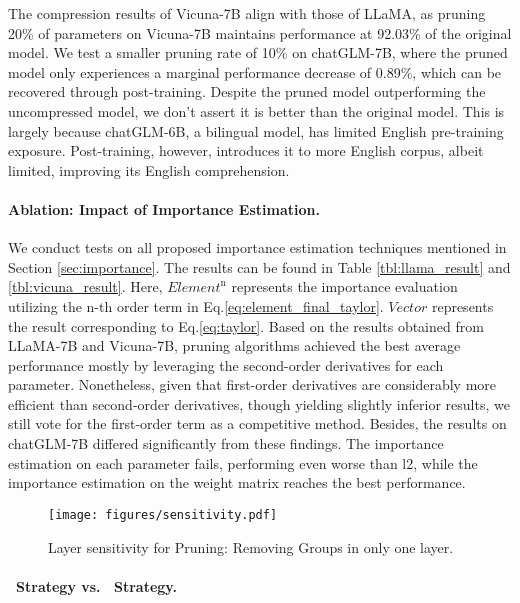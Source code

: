 The compression results of Vicuna-7B align with those of LLaMA, as pruning 20\% of parameters on Vicuna-7B maintains performance at 92.03\% of the original model. We test a smaller pruning rate of 10\% on chatGLM-7B, where the pruned model only experiences a marginal performance decrease of 0.89\%, which can be recovered through post-training. Despite the pruned model outperforming the uncompressed model, we don't assert it is better than the original model. This is largely because chatGLM-6B, a bilingual model, has limited English pre-training exposure. Post-training, however, introduces it to more English corpus, albeit limited, improving its English comprehension.

\paragraph{Ablation: Impact of Importance Estimation.} 
We conduct tests on all proposed importance estimation techniques mentioned in Section \ref{sec:importance}. The results can be found in Table \ref{tbl:llama_result} and \ref{tbl:vicuna_result}. Here, $\textit{Element}^\text{n}$ represents the importance evaluation utilizing the n-th order term in Eq.\ref{eq:element_final_taylor}. $\textit{Vector}$ represents the result corresponding to Eq.\ref{eq:taylor}. Based on the results obtained from LLaMA-7B and Vicuna-7B, pruning algorithms achieved the best average performance mostly by leveraging the second-order derivatives for each parameter. Nonetheless, given that first-order derivatives are considerably more efficient than second-order derivatives, though yielding slightly inferior results, 
we still vote for the first-order term as a competitive method. Besides, the results on chatGLM-7B differed significantly from these findings. The importance estimation on each parameter fails, performing even worse than l2, while the importance estimation on the weight matrix reaches the best performance. 

\begin{wrapfigure}{r}{6.5cm} 
    \vspace{-6mm}
    \texttt{[image: figures/sensitivity.pdf]} 
    \vspace{-2mm}
    \caption{Layer sensitivity for Pruning: Removing Groups in only one layer. 
    } \label{fig:layer_sensitivity}
\vspace{-0.8cm}
\end{wrapfigure}

\paragraph{\channelname\ Strategy vs. \blockname\ Strategy.} \label{sec:block_channel}

